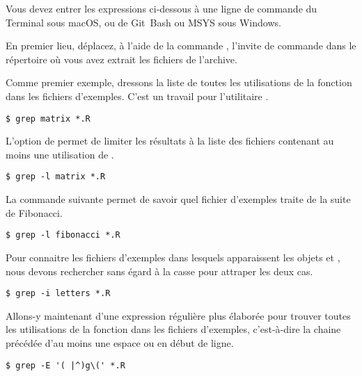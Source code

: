 Vous devez entrer les expressions ci-dessous à une ligne de commande
du Terminal sous macOS, ou de Git~Bash
ou MSYS sous Windows.


En premier lieu, déplacez, à l'aide de la commande ,
l'invite de commande dans le répertoire où vous avez extrait les
fichiers de l'archive.

Comme premier exemple, dressons la liste de toutes les utilisations de
la fonction  dans les fichiers d'exemples. C'est un
travail pour l'utilitaire .
\begin{Schunk}
\begin{Verbatim}
$ grep matrix *.R
\end{Verbatim}
\end{Schunk}

L'option  de  permet de limiter les résultats à
la liste des fichiers contenant au moins une utilisation de
.
\begin{Schunk}
\begin{Verbatim}
$ grep -l matrix *.R
\end{Verbatim}
\end{Schunk}

La commande suivante permet de savoir quel fichier d'exemples traite
de la suite de Fibonacci.
\begin{Schunk}
\begin{Verbatim}
$ grep -l fibonacci *.R
\end{Verbatim}
\end{Schunk}

Pour connaitre les fichiers d'exemples dans lesquels apparaissent les
objets  et , nous devons rechercher sans
égard à la casse pour attraper les deux cas.
\begin{Schunk}
\begin{Verbatim}
$ grep -i letters *.R
\end{Verbatim}
\end{Schunk}

Allons-y maintenant d'une expression régulière plus élaborée pour
trouver toutes les utilisations de la fonction  dans les
fichiers d'exemples, c'est-à-dire la chaine  précédée d'au
moins une espace ou en début de ligne.
\begin{Schunk}
\begin{Verbatim}
$ grep -E '( |^)g\(' *.R
\end{Verbatim}
\end{Schunk}

